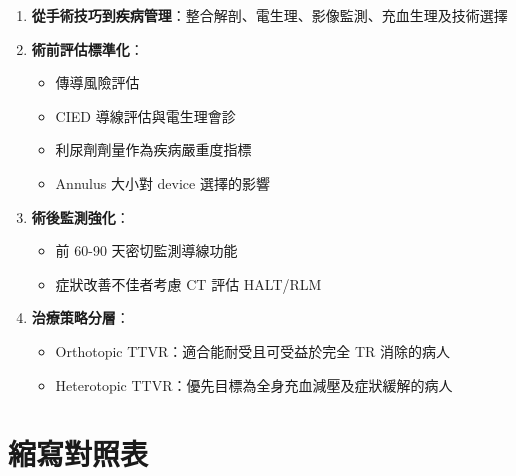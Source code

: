 \documentclass[12pt,a4paper]{article}
\begin{document}
\begin{center}
\begin{tcolorbox}[
    colback=emergency_blue!5!white,
    colframe=emergency_blue,
    title=\textbf{三尖瓣介入治療的典範轉移},
    fonttitle=\bfseries,
    width=0.95\textwidth
]
\begin{enumerate}
    \item \textbf{從手術技巧到疾病管理}：整合解剖、電生理、影像監測、充血生理及技術選擇

    \item \textbf{術前評估標準化}：
    \begin{itemize}[nosep]
        \item 傳導風險評估
        \item CIED 導線評估與電生理會診
        \item 利尿劑劑量作為疾病嚴重度指標
        \item Annulus 大小對 device 選擇的影響
    \end{itemize}

    \item \textbf{術後監測強化}：
    \begin{itemize}[nosep]
        \item 前 60-90 天密切監測導線功能
        \item 症狀改善不佳者考慮 CT 評估 HALT/RLM
    \end{itemize}

    \item \textbf{治療策略分層}：
    \begin{itemize}[nosep]
        \item Orthotopic TTVR：適合能耐受且可受益於完全 TR 消除的病人
        \item Heterotopic TTVR：優先目標為全身充血減壓及症狀緩解的病人
    \end{itemize}
\end{enumerate}
\end{tcolorbox}
\end{center}

\section{縮寫對照表}
\end{document}
